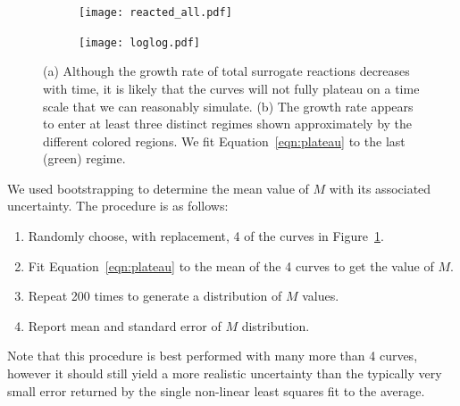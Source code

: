 \documentclass{article}
\begin{document}
  \begin{figure}
  \centering
  \begin{subfigure}{0.45\textwidth}
  \texttt{[image: reacted\_all.pdf]}
  \caption{}\label{fig:reacted_all}
  \end{subfigure}
  \begin{subfigure}{0.45\textwidth}
  \texttt{[image: loglog.pdf]}
  \caption{}\label{fig:loglog}
  \end{subfigure}
  \caption{(a) Although the growth rate of total surrogate reactions decreases 
  with time, it is likely that the curves will not fully plateau on a time scale
  that we can reasonably simulate. (b) The growth rate appears to enter at least
  three distinct regimes shown approximately by the different colored regions. We
  fit Equation~\ref{eqn:plateau} to the last (green) regime. 
  }\label{fig:plateau}
  \end{figure}
  
  We used bootstrapping to determine the mean value of $M$ with its associated
  uncertainty. The procedure is as follows:
  \begin{enumerate}
  	\item Randomly choose, with replacement, 4 of the curves in Figure~\ref{fig:reacted_all}.
  	\item Fit Equation~\ref{eqn:plateau} to the mean of the 4 curves to get the value of $M$.
  	\item Repeat 200 times to generate a distribution of $M$ values. 
  	\item Report mean and standard error of $M$ distribution.
  \end{enumerate}
  Note that this procedure is best performed with many more than 4 curves, however
  it should still yield a more realistic uncertainty than the typically very small
  error returned by the single non-linear least squares fit to the average. 

  \pagebreak
  
\end{document}
